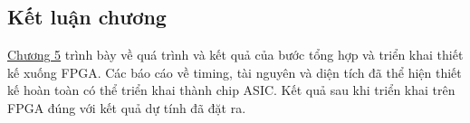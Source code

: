 \subsection{Kết luận chương}

\hyperref[chuong5]{Chương 5} trình bày về quá trình và kết quả của bước tổng hợp và triển khai thiết kế xuống FPGA. Các báo cáo về timing, tài nguyên và diện tích đã thể  hiện thiết kế  hoàn toàn có thể  triển khai thành chip ASIC. Kết quả sau khi triển khai trên FPGA đúng với kết quả dự tính đã đặt ra.
\newpage